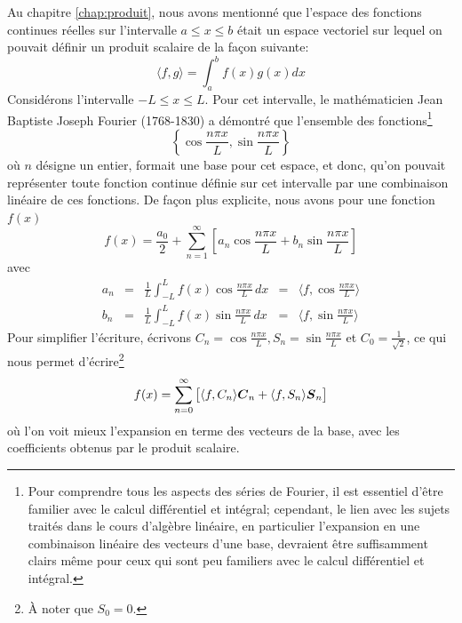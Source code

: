 Au chapitre \ref{chap:produit}, nous avons mentionné que l'espace des fonctions continues réelles 
sur l'intervalle $a\leq x \leq b$ était un espace vectoriel sur lequel
on pouvait définir un produit scalaire de la façon suivante:
\[
\langle f, g \rangle = \int_a^b f(x) g(x) dx
\]
Considérons l'intervalle $-L\leq x \leq L$. Pour cet intervalle, le mathématicien Jean Baptiste Joseph
Fourier (1768-1830) a démontré que l'ensemble des fonctions\footnote{Pour comprendre 
tous les aspects des séries de Fourier, il est essentiel
d'être familier avec le calcul différentiel et intégral; cependant, le lien avec les sujets traités dans
le cours d'algèbre linéaire, en particulier l'expansion en une combinaison linéaire des vecteurs
d'une base, devraient être suffisamment clairs même pour ceux qui sont peu familiers avec le calcul 
différentiel et intégral.}
\[
\left\{ \cos \frac{n\pi x}{L}, \sin \frac{n\pi x}{L} \right\}
\]
où $n$ désigne un entier, formait une base pour cet espace, et donc, qu'on pouvait représenter
toute fonction continue définie sur cet intervalle par une combinaison linéaire de ces fonctions.
De façon plus explicite, nous avons pour une fonction $f(x)$ 
\[
f(x) = \frac{a_0}{2} + \sum_{n=1}^\infty \left[a_n \cos \frac{n\pi x}{L} + b_n \sin \frac{n\pi x}{L}\right]
\]
avec
\[
\begin{matrix}
a_n &=&\displaystyle \frac{1}{L} \int_{-L}^L f(x) \cos \frac{n\pi x}{L} \, dx  &=& \langle f, \cos \frac{n\pi x}{L} \rangle \\
b_n &=&\displaystyle \frac{1}{L} \int_{-L}^L f(x) \sin \frac{n\pi x}{L} \, dx &=& \langle f, \sin \frac{n\pi x}{L} \rangle 
\end{matrix}
\]
Pour simplifier l'écriture, écrivons $\displaystyle C_n = \cos \frac{n\pi x}{L}, S_n = \sin \frac{n\pi x}{L}$
et $C_0 = \frac{1}{\sqrt{2}}$, ce qui nous permet d'écrire\footnote{À noter que $S_0 = 0$.}
\[
f(x) = \sum_{n=0}^\infty \big[ \langle f, C_n \rangle \boldsymbol{C}_n + \langle f, S_n \rangle \boldsymbol{S}_n \big]
\]
où l'on voit mieux l'expansion en terme des vecteurs de la base, avec les coefficients obtenus par
le produit scalaire.

